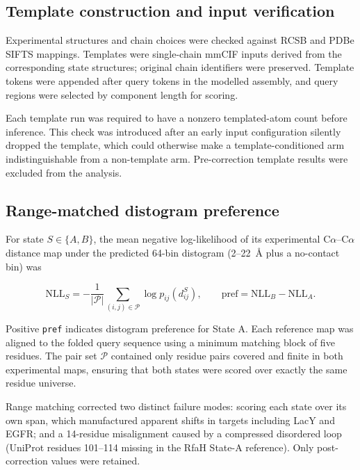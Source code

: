 \documentclass[10pt,a4paper]{article}
\begin{document}
\subsection{Template construction and input verification}

Experimental structures and chain choices were checked against RCSB and PDBe SIFTS mappings. Templates were single-chain mmCIF inputs derived from the corresponding state structures; original chain identifiers were preserved. Template tokens were appended after query tokens in the modelled assembly, and query regions were selected by component length for scoring.

Each template run was required to have a nonzero templated-atom count before inference. This check was introduced after an early input configuration silently dropped the template, which could otherwise make a template-conditioned arm indistinguishable from a non-template arm. Pre-correction template results were excluded from the analysis.

\subsection{Range-matched distogram preference}

For state $S\in\{A,B\}$, the mean negative log-likelihood of its experimental C$\alpha$--C$\alpha$ distance map under the predicted 64-bin distogram (2--22~\AA{} plus a no-contact bin) was

\begin{equation}
\mathrm{NLL}_S=-\frac{1}{|\mathcal P|}
\sum_{(i,j)\in\mathcal P}\log p_{ij}(d_{ij}^{S}),
\qquad
\mathrm{pref}=\mathrm{NLL}_B-\mathrm{NLL}_A.
\end{equation}

Positive \texttt{pref} indicates distogram preference for State A. Each reference map was aligned to the folded query sequence using a minimum matching block of five residues. The pair set $\mathcal P$ contained only residue pairs covered and finite in both experimental maps, ensuring that both states were scored over exactly the same residue universe.

Range matching corrected two distinct failure modes: scoring each state over its own span, which manufactured apparent shifts in targets including LacY and EGFR; and a 14-residue misalignment caused by a compressed disordered loop (UniProt residues 101--114 missing in the RfaH State-A reference). Only post-correction values were retained.
\end{document}

